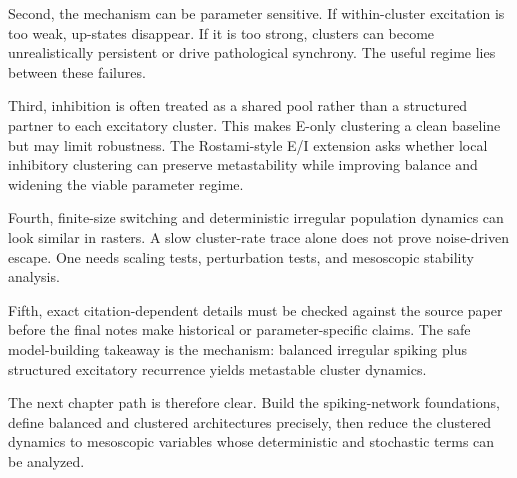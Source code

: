 Second, the mechanism can be parameter sensitive. If within-cluster excitation is too weak, up-states disappear. If it is too strong, clusters can become unrealistically persistent or drive pathological synchrony. The useful regime lies between these failures.

Third, inhibition is often treated as a shared pool rather than a structured partner to each excitatory cluster. This makes E-only clustering a clean baseline but may limit robustness. The Rostami-style E/I extension asks whether local inhibitory clustering can preserve metastability while improving balance and widening the viable parameter regime.

Fourth, finite-size switching and deterministic irregular population dynamics can look similar in rasters. A slow cluster-rate trace alone does not prove noise-driven escape. One needs scaling tests, perturbation tests, and mesoscopic stability analysis.

Fifth, exact citation-dependent details must be checked against the source paper before the final notes make historical or parameter-specific claims. The safe model-building takeaway is the mechanism: balanced irregular spiking plus structured excitatory recurrence yields metastable cluster dynamics.

The next chapter path is therefore clear. Build the spiking-network foundations, define balanced and clustered architectures precisely, then reduce the clustered dynamics to mesoscopic variables whose deterministic and stochastic terms can be analyzed.

